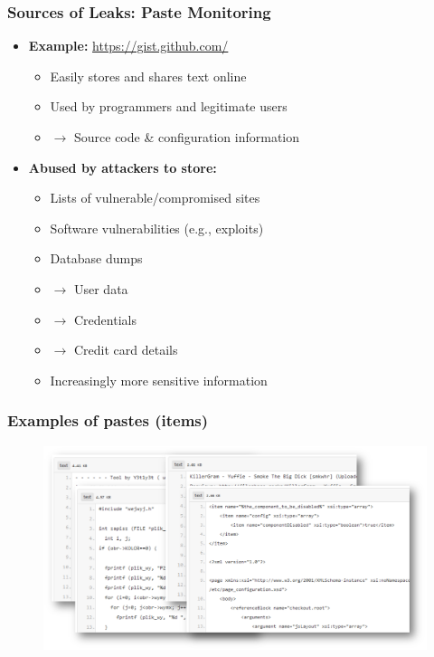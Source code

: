 \documentclass[10pt,aspectratio=169, colorlinks=true, linkcolor=circlBlue]{beamer}
\begin{document}
\begin{frame}
    \frametitle{Sources of Leaks: Paste Monitoring}
    \begin{itemize}
        \item \textbf{Example:} \url{https://gist.github.com/}
        \begin{itemize}
            \item Easily stores and shares text online
            \item Used by programmers and legitimate users
            \item[] $\rightarrow$ Source code \& configuration information
        \end{itemize}
        \vspace{0.3cm}
        \item \textbf{Abused by attackers to store:}
        \begin{itemize}
            \item Lists of vulnerable/compromised sites
            \item Software vulnerabilities (e.g., exploits)
            \item Database dumps
            \item[] $\rightarrow$ User data
            \item[] $\rightarrow$ Credentials
            \item[] $\rightarrow$ Credit card details
            \item Increasingly more sensitive information
        \end{itemize}
    \end{itemize}
\end{frame}

\begin{frame}[t,plain]
        \frametitle{Examples of pastes (items)}
    \begin{figure}
        \includegraphics[scale=0.32, angle=0]{images/pastes-ex.png}
    \end{figure}
\end{frame}
\end{document}
